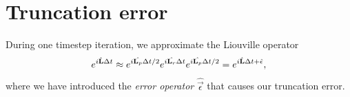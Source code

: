 \section{Truncation error}
During one timestep iteration, we approximate the Liouville operator
\begin{align}
	e^{i\hat{\mathbf L} \Delta t} \approx e^{i\hat{\mathbf L_p} \Delta t/2}e^{i\hat{\mathbf L_r} \Delta t}e^{i\hat{\mathbf L_p} \Delta t/2} = e^{i\hat{\mathbf L} \Delta t + \hat{\mathbf \epsilon}},
\end{align}
where we have introduced the \textit{error operator} $\hat{\vec \epsilon}$ that causes our truncation error. 
